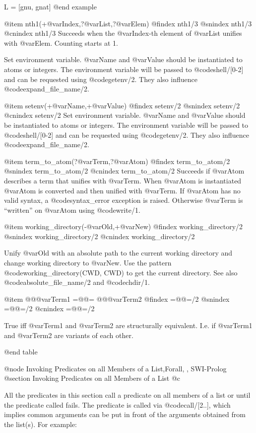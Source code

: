 L = [gnu, gnat]
@end example

@item nth1(+@var{Index},?@var{List},?@var{Elem})
@findex nth1/3
@snindex nth1/3
@cnindex nth1/3
Succeeds when the @var{Index}-th element of @var{List} unifies with
@var{Elem}. Counting starts at 1.

Set environment variable.  @var{Name} and @var{Value} should be
instantiated to atoms or integers.  The environment variable will be
passed to @code{shell/[0-2]} and can be requested using @code{getenv/2}.
They also influence @code{expand_file_name/2}.

@item setenv(+@var{Name},+@var{Value})
@findex setenv/2
@snindex setenv/2
@cnindex setenv/2
Set environment variable.  @var{Name} and @var{Value} should be
instantiated to atoms or integers.  The environment variable will be
passed to @code{shell/[0-2]} and can be requested using @code{getenv/2}.
They also influence @code{expand_file_name/2}.

@item term_to_atom(?@var{Term},?@var{Atom})
@findex term_to_atom/2
@snindex term_to_atom/2
@cnindex term_to_atom/2
Succeeds if @var{Atom} describes a term that unifies with @var{Term}. When
@var{Atom} is instantiated @var{Atom} is converted and then unified with
@var{Term}.  If @var{Atom} has no valid syntax, a @code{syntax_error}
exception is raised. Otherwise @var{Term} is ``written'' on @var{Atom}
using @code{write/1}.

@item working_directory(-@var{Old},+@var{New})
@findex working_directory/2
@snindex working_directory/2
@cnindex working_directory/2

Unify @var{Old} with an absolute path to the current working directory
and change working directory to @var{New}.  Use the pattern
@code{working_directory(CWD, CWD)} to get the current directory.  See
also @code{absolute_file_name/2} and @code{chdir/1}.

@item @@@var{Term1} =@@= @@@var{Term2}
@findex =@@=/2
@snindex =@@=/2
@cnindex =@@=/2

True iff @var{Term1} and @var{Term2} are structurally equivalent. I.e. if @var{Term1} and @var{Term2} are variants of each other.

@end table

@node Invoking Predicates on all Members of a List,Forall, , SWI-Prolog
@section Invoking Predicates on all Members of a List
@c \label{sec:applylist}

All the predicates in this section call a predicate on all members of a
list or until the predicate called fails.  The predicate is called via
@code{call/[2..]}, which implies common arguments can be put in
front of the arguments obtained from the list(s). For example:

